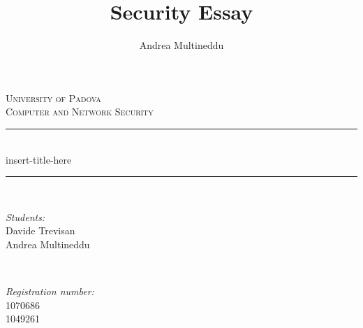 \documentclass[12pt]{article}
\title{Security Essay}
\date{}
\author{Andrea Multineddu}
\begin{document}
		
		
		
		\begin{titlepage}
			
			\newcommand{\HRule}{\rule{\linewidth}{0.5mm}} %
			
			\center %
			
			
			\textsc{\LARGE University of Padova}\\[1.5cm] %
			\textsc{\Large Computer and Network Security}\\[0.5cm] %
			
			
			\HRule \\[0.4cm]
			{ \huge insert-title-here}\\[0.3cm]
			\HRule \\[1.5cm]
			
			
			\begin{minipage}{0.4\textwidth}
				\begin{flushleft} \large
					\emph{Students:}\\
					Davide Trevisan\\ %
					Andrea Multineddu\\
				\end{flushleft}
			\end{minipage}
			~
			\begin{minipage}{0.4\textwidth}
				\begin{flushright}\large
					\emph{Registration number:} \\
					\textsc{1070686}\\ %
					\textsc{1049261}\\
				\end{flushright}
			\end{minipage}\\[1cm]
			

\end{titlepage}
\end{document}
